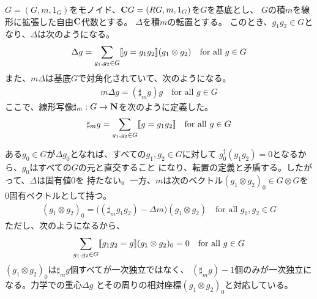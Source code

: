 	\begin{example}[モノイドの積の転置]\label{eg:モノイドの積の転置} %
		$G=(G,m,1_G)$をモノイド、${\mathbf{C}}G=(RG,m,1_G)$を$G$を基底とし、
		$G$の積$m$を線形に拡張した自由${\mathbf{C}}$代数とする。
		$\Delta$を積$m$の転置とする。
		このとき、$g_1g_2\in G$となり、$\Delta$は次のようになる。
		\begin{equation*}\begin{split} %
			\Delta g = \sum_{g_1,g_2\in G}\jump{g=g_1g_2}(g_1\otimes g_2)
			\quad\text{for all }g\in G
		\end{split}\end{equation*} %
		また、$m\Delta$は基底$G$で対角化されていて、次のようになる。
		\begin{equation*}\begin{split} %
			m\Delta g = (\sharp_m g)g \quad\text{for all }g\in G
		\end{split}\end{equation*} %
		ここで、線形写像$\sharp_m:G\to {\mathbf{N}}$を次のように定義した。
		\begin{equation*}\begin{split} %
			\sharp_m g = \sum_{g_1,g_2\in G}\jump{g=g_1g_2}
			\quad\text{for all }g\in G
		\end{split}\end{equation*} %

		ある$g_0\in G$が$\Delta g_0$となれば、すべての$g_1,g_2\in G$に対して
		$g_0^\dag(g_1g_2)=0$となるから、$g_0$はすべての$G$の元と直交すること
		になり、転置の定義と矛盾する。したがって、$\Delta$は固有値$0$を
		持たない。一方、$m$は次のベクトル$(g_1\otimes g_2)_0\in G\otimes G$を
		$0$固有ベクトルとして持つ。
		\begin{equation*}\begin{split} %
			(g_1\otimes g_2)_0 = \bigl((\sharp_m g_1g_2)- \Delta m\bigr)
			(g_1\otimes g_2)\quad\text{for all }g_1,g_2\in G
		\end{split}\end{equation*} %
		ただし、次のようになるから、
		\begin{equation*}\begin{split} %
			\sum_{g_1,g_2\in G}\jump{g_1g_2=g}(g_1\otimes g_2)_0=0
			\quad\text{for all }g\in G
		\end{split}\end{equation*} %
		$(g_1\otimes g_2)_0$は$\sharp_m g$個すべてが一次独立ではなく、
		$(\sharp_m g)-1$個のみが一次独立になる。力学での重心$\Delta g$
		とその周りの相対座標$(g_1\otimes g_2)_0$と対応している。
	\end{example} %

